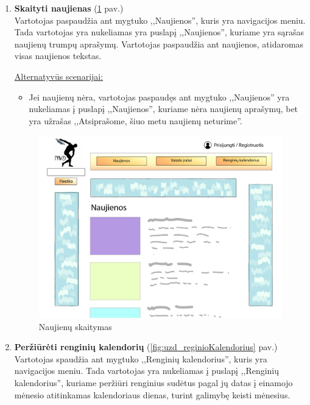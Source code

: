 \documentclass{VUMIFPSkursinis}
\begin{document}
		\begin{enumerate} [label = \textbf{U\arabic*.}]
			\item \textbf{Skaityti naujienas} (\ref{fig:uzd_skaitymas} pav.)\\
				Vartotojas paspaudžia ant mygtuko ,,Naujienos'', kuris yra navigacijos meniu. Tada vartotojas yra nukeliamas yra puslapį ,,Naujienos'', kuriame yra sąrašas naujienų trumpų aprašymų. Vartotojas paspaudžia ant naujienos, atidaromas visas naujienos tekstas.
				
				\underline{Alternatyvūs scenarijai:}
				\begin{itemize}
					\item Jei naujienų nėra, vartotojas paspaudęs ant mygtuko ,,Naujienos'' yra nukeliamas į puslapį ,,Naujienos'', kuriame nėra naujienų aprašymų, bet yra užrašas ,,Atsiprašome, šiuo metu naujienų neturime''. 
				\end{itemize}

				\begin{figure}[H]
					\centering
					\includegraphics[width=\textwidth]{img/PSI4/Naujienos-01.jpg}
					\caption{Naujienų skaitymas}
					\label{fig:uzd_skaitymas}
				\end{figure}
				
			\item \textbf{Peržiūrėti renginių kalendorių} (\ref{fig:uzd_reginioKalendorius} pav.)\\
				Vartotojas spaudžia ant mygtuko ,,Renginių kalendorius'', kuris yra navigacijos meniu. Tada vartotojas yra nukeliamas į puslapį ,,Renginių kalendorius'', kuriame peržiūri renginius sudėtus pagal jų datas į einamojo mėnesio atitinkamas kalendoriaus dienas, turint galimybę keisti mėnesius.
				

\end{enumerate}
\end{document}
